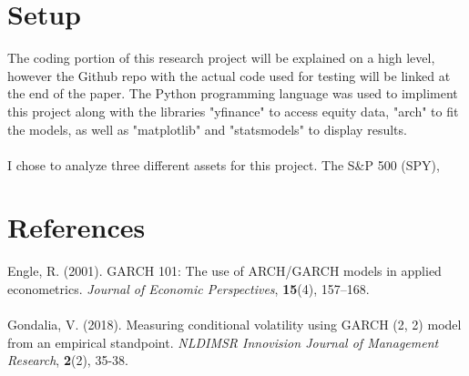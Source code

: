 \documentclass{article}
\begin{document}
\section{Setup}
The coding portion of this research project will be explained on a high level, however the Github repo with the actual code used for testing will be linked at the end of the paper. The Python programming language was used to impliment this project along with the libraries "yfinance" to access equity data, "arch" to fit the models, as well as "matplotlib" and "statsmodels" to display results.  \\
\\
I chose to analyze three different assets for this project. The S\&P 500 (SPY), 
\section{References}
Engle, R. (2001). GARCH 101: The use of ARCH/GARCH models in applied econometrics. \textit{Journal of Economic Perspectives}, \textbf{15}(4), 157–168. \\
\\
Gondalia, V. (2018). Measuring conditional volatility using GARCH (2, 2) model from an empirical standpoint. \textit{NLDIMSR Innovision Journal of Management Research}, \textbf{2}(2), 35-38.
\end{document}
